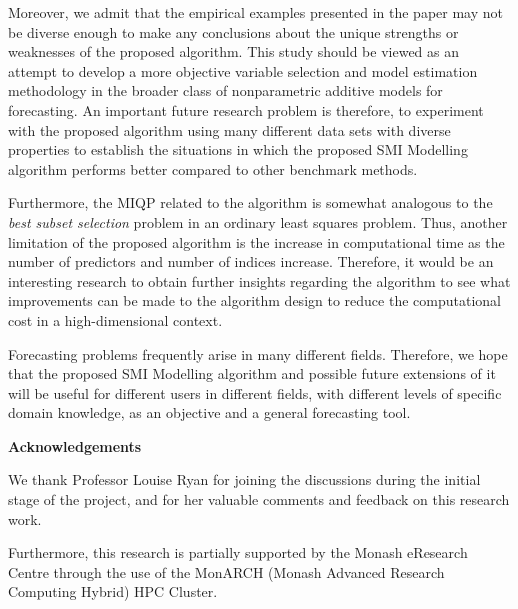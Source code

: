 \documentclass[11pt,a4paper,]{article}
\begin{document}
Moreover, we admit that the empirical examples presented in the paper
may not be diverse enough to make any conclusions about the unique
strengths or weaknesses of the proposed algorithm. This study should be
viewed as an attempt to develop a more objective variable selection and
model estimation methodology in the broader class of nonparametric
additive models for forecasting. An important future research problem is
therefore, to experiment with the proposed algorithm using many
different data sets with diverse properties to establish the situations
in which the proposed SMI Modelling algorithm performs better compared
to other benchmark methods.

Furthermore, the MIQP related to the algorithm is somewhat analogous to
the \emph{best subset selection} problem in an ordinary least squares
problem. Thus, another limitation of the proposed algorithm is the
increase in computational time as the number of predictors and number of
indices increase. Therefore, it would be an interesting research to
obtain further insights regarding the algorithm to see what improvements
can be made to the algorithm design to reduce the computational cost in
a high-dimensional context.

Forecasting problems frequently arise in many different fields.
Therefore, we hope that the proposed SMI Modelling algorithm and
possible future extensions of it will be useful for different users in
different fields, with different levels of specific domain knowledge, as
an objective and a general forecasting tool. \newline

\textbf{\large{Acknowledgements}}

We thank Professor Louise Ryan for joining the discussions during the
initial stage of the project, and for her valuable comments and feedback
on this research work.

Furthermore, this research is partially supported by the Monash
eResearch Centre through the use of the MonARCH (Monash Advanced
Research Computing Hybrid) HPC Cluster.

\printbibliography
\end{document}
